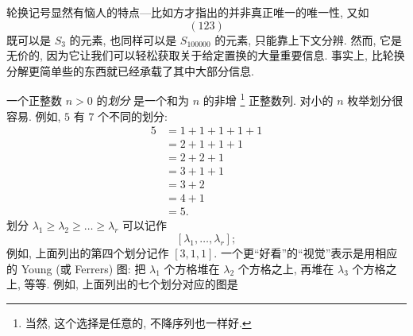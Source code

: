 轮换记号显然有恼人的特点---比如方才指出的并非真正唯一的唯一性, 又如
\[
(123)
\]
既可以是 $S_3$ 的元素, 也同样可以是 $S_{100000}$ 的元素, 只能靠上下文分辨. 然而, 它是无价的, 因为它让我们可以轻松获取关于给定置换的大量重要信息. 事实上, 比轮换分解更简单些的东西就已经承载了其中大部分信息.

一个正整数 $n > 0$ 的\emph{划分}%
是一个和为 $n$ 的非增%
\footnote{当然, 这个选择是任意的, 不降序列也一样好.}%
正整数列. 对小的 $n$ 枚举划分很容易. 例如, $5$ 有 $7$ 个不同的划分:
\[
\begin{aligned}
5 &= 1 + 1 + 1 + 1 + 1 \\
&= 2 + 1 + 1 + 1 \\
&= 2 + 2 + 1 \\
&= 3 + 1 + 1 \\
&= 3 + 2 \\
&= 4 + 1 \\
&= 5.
\end{aligned}
\]
划分 $\lambda_1 \geq \lambda_2 \geq \dots \geq \lambda_r$ 可以记作
\[
[\lambda_1,\dots,\lambda_r];
\]
例如, 上面列出的第四个划分记作 $[3,1,1]$. 一个更``好看''的``视觉''表示是用相应的 Young (或 Ferrers) 图: 把 $\lambda_1$ 个方格堆在 $\lambda_2$ 个方格之上, 再堆在 $\lambda_3$ 个方格之上, 等等. 例如, 上面列出的七个划分对应的图是
